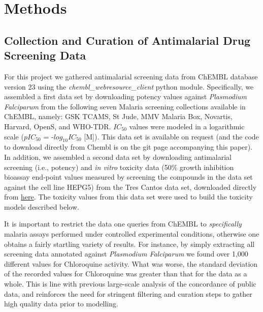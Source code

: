 \documentclass{article}
\begin{document}
\section{Methods}

\subsection{Collection and Curation of Antimalarial Drug Screening Data}

For this project we gathered antimalarial screening data from ChEMBL database version 23 using the {\it chembl\_webresource\_client} python module\cite{Davies2015}.
Specifically, we assembled a first data set by downloading potency values against \textit{Plasmodium Falciparum} from the following seven Malaria screening collections available in ChEMBL, namely: GSK TCAMS, St Jude, MMV Malaria Box, Novartis, Harvard, OpenS, and WHO-TDR.
$IC_{50}$ values were modeled in a logarithmic scale ($pIC_{50}$ = -$log_{10} IC_{50}$ [M]). This data set is available on request (and the code to download directly from Chembl is on the git page accompanying this paper).
\newline
\newline
In addition, we assembled a second data set by downloading antimalarial screening (i.e., potency) and {\it in vitro} toxicity data (50\% growth inhibition bioassay end-point values measured by screening the compounds in the data set against the cell line HEPG5) from the Tres Cantos data set, downloaded directly from \href{https://chembl.gitbook.io/chembl-ntd/downloads/deposited-set-1-gsk-tcams-dataset-20th-may-2010}{here}. The toxicity values from this data set were used to build the toxicity models described below.
\newline
\newline


It is important to restrict the data one queries from ChEMBL to \textit{specifically} malaria assays performed under controlled experimental conditions, otherwise one obtains a fairly startling variety of results. 
For instance, by simply extracting all screening data annotated against 
\textit{Plasmodium Falciparum} we found over 1,000 different values for Chloroquine activity. What was worse, the standard deviation of the recorded values for Chloroquine was greater than that for the data as a whole. This is line with previous large-scale analysis of the concordance of public data\cite{Kalliokoski2013,Kalliokoski2013B,Cortes-Ciriano2015}, and reinforces the need for stringent filtering and curation steps to gather high quality data prior to modelling.
\end{document}
